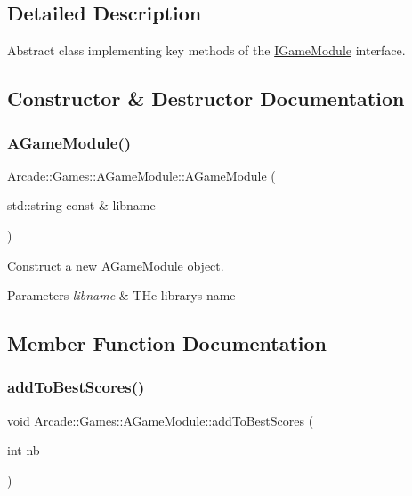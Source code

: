 \subsection{Detailed Description}
Abstract class implementing key methods of the \mbox{\hyperlink{classArcade_1_1Games_1_1IGameModule}{I\+Game\+Module}} interface. 

\subsection{Constructor \& Destructor Documentation}
\mbox{\label{classArcade_1_1Games_1_1AGameModule_a489ae3b9ad35cf20ee05be8e3f365a99}} 
\subsubsection{\texorpdfstring{AGameModule()}{AGameModule()}}
{\footnotesize\ttfamily Arcade\+::\+Games\+::\+A\+Game\+Module\+::\+A\+Game\+Module (\begin{DoxyParamCaption}\item[{std\+::string const \&}]{libname }\end{DoxyParamCaption})}



Construct a new \mbox{\hyperlink{classArcade_1_1Games_1_1AGameModule}{A\+Game\+Module}} object. 


\begin{DoxyParams}{Parameters}
{\em libname} & T\+He library\textquotesingle{}s name \\
\hline
\end{DoxyParams}


\subsection{Member Function Documentation}
\mbox{\label{classArcade_1_1Games_1_1AGameModule_a961c4a606bcc5d2ab1ead8b3c0bb3408}} 
\subsubsection{\texorpdfstring{addToBestScores()}{addToBestScores()}}
{\footnotesize\ttfamily void Arcade\+::\+Games\+::\+A\+Game\+Module\+::add\+To\+Best\+Scores (\begin{DoxyParamCaption}\item[{int}]{nb }\end{DoxyParamCaption})\hspace{0.3cm}{\ttfamily [protected]}}



